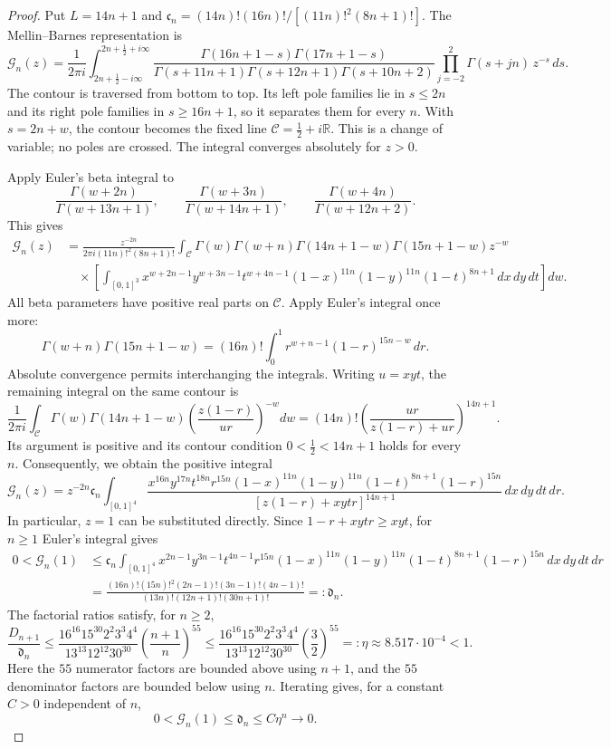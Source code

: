 \documentclass[11pt]{article}
\begin{document}
\begin{proof}
Put $L=14n+1$ and $\mathfrak c_n=(14n)!(16n)!/[(11n)!^2(8n+1)!]$.
The Mellin--Barnes representation \cite[Eq.~16.17.1]{DLMF} is
\[
\mathcal{G}_n(z)=\frac{1}{2\pi i}
\int_{2n+\frac12-i\infty}^{2n+\frac12+i\infty}
\frac{
 \Gamma(16n+1-s)\Gamma(17n+1-s)
}{
 \Gamma(s+11n+1)\Gamma(s+12n+1)\Gamma(s+10n+2)
}\prod_{j=-2}^{2}\Gamma(s+jn)\,z^{-s}\,ds.
\]
The contour is traversed from bottom to top. Its left pole families
lie in $s\leq2n$ and its right pole families in $s\geq16n+1$,
so it separates them for every $n$.
With $s=2n+w$, the contour becomes the fixed line
$\mathcal C=\tfrac12+i\mathbb R$.
This is a change of variable; no poles are crossed.
The integral converges absolutely for $z>0$.

Apply Euler's beta integral \cite[Eq.~5.12.1]{DLMF} to
\[
\frac{\Gamma(w+2n)}{\Gamma(w+13n+1)},\qquad
\frac{\Gamma(w+3n)}{\Gamma(w+14n+1)},\qquad
\frac{\Gamma(w+4n)}{\Gamma(w+12n+2)}.
\]
This gives
\[
\begin{aligned}
\mathcal{G}_n(z)
&=\frac{z^{-2n}}{2\pi i(11n)!^2(8n+1)!}
\int_{\mathcal C}
\Gamma(w)\Gamma(w+n)\Gamma(14n+1-w)\Gamma(15n+1-w)z^{-w}\\
&\quad\times\left[\int_{[0,1]^3}
x^{w+2n-1}y^{w+3n-1}t^{w+4n-1}
(1-x)^{11n}(1-y)^{11n}(1-t)^{8n+1}
\,dx\,dy\,dt\right]dw.
\end{aligned}
\]
All beta parameters have positive real parts on $\mathcal C$.
Apply Euler's integral once more:
\[
\Gamma(w+n)\Gamma(15n+1-w)
=(16n)!\int_0^1 r^{w+n-1}(1-r)^{15n-w}\,dr.
\]
Absolute convergence permits interchanging the integrals.
Writing $u=xyt$, the remaining integral on the same contour is
\cite[Eq.~5.13.1]{DLMF}
\[
\frac{1}{2\pi i}\int_{\mathcal C}
\Gamma(w)\Gamma(14n+1-w)
\left(\frac{z(1-r)}{ur}\right)^{-w}dw
=(14n)!\left(\frac{ur}{z(1-r)+ur}\right)^{14n+1}.
\]
Its argument is positive and its contour condition
$0<\tfrac12<14n+1$ holds for every $n$.
Consequently, we obtain the positive integral
\[
\mathcal{G}_n(z)=z^{-2n}\mathfrak c_n\int_{[0,1]^4}
\frac{
x^{16n}y^{17n}t^{18n}r^{15n}
(1-x)^{11n}(1-y)^{11n}(1-t)^{8n+1}(1-r)^{15n}
}{[z(1-r)+xytr]^{14n+1}}
\,dx\,dy\,dt\,dr.
\]
In particular, $z=1$ can be substituted directly.
Since $1-r+xytr\geq xyt$, for $n\geq1$ Euler's integral gives
\[
\begin{aligned}
0<\mathcal{G}_n(1)
&\leq \mathfrak c_n\int_{[0,1]^4}
x^{2n-1}y^{3n-1}t^{4n-1}r^{15n}
(1-x)^{11n}(1-y)^{11n}(1-t)^{8n+1}(1-r)^{15n}
\,dx\,dy\,dt\,dr\\
&=\frac{(16n)!(15n)!^2(2n-1)!(3n-1)!(4n-1)!}
{(13n)!(12n+1)!(30n+1)!}
=:\mathfrak d_n.
\end{aligned}
\]
The factorial ratios satisfy, for $n\geq2$,
\[
\frac{D_{n+1}}{\mathfrak d_n}
\leq
\frac{16^{16}15^{30}2^2 3^3 4^4}{13^{13}12^{12}30^{30}}
\left(\frac{n+1}{n}\right)^{55}
\leq
\frac{16^{16}15^{30}2^2 3^3 4^4}{13^{13}12^{12}30^{30}}
\left(\frac32\right)^{55}
=:\eta\approx8.517\cdot10^{-4}<1.
\]
Here the $55$ numerator factors are bounded above using $n+1$,
and the $55$ denominator factors are bounded below using $n$.
Iterating gives, for a constant $C>0$ independent of $n$,
\[
0<\mathcal{G}_n(1)\leq \mathfrak d_n\leq C\eta^n\longrightarrow0.
\]


\end{proof}
\end{document}
